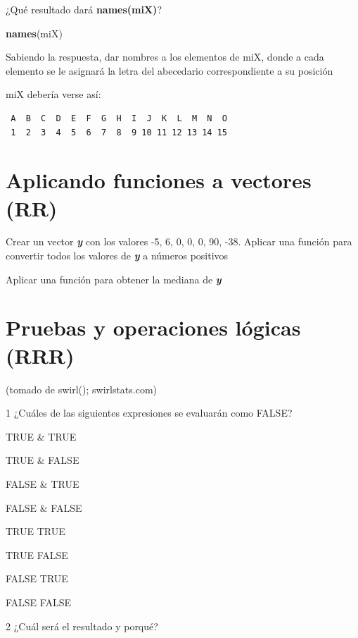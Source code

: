 \documentclass[]{book}
\newenvironment{Shaded}{\begin{snugshade}}{\end{snugshade}}
\newcommand{\KeywordTok}[1]{\textcolor[rgb]{0.13,0.29,0.53}{\textbf{#1}}}
\newcommand{\NormalTok}[1]{#1}
\begin{document}
¿Qué resultado dará \textbf{names(miX)}?

\begin{Shaded}
\begin{Highlighting}[]
\KeywordTok{names}\NormalTok{(miX)}
\end{Highlighting}
\end{Shaded}

Sabiendo la respuesta, dar nombres a los elementos de miX, donde a cada elemento se le asignará la letra del abecedario correspondiente a su posición

miX debería verse así:

\begin{verbatim}
 A  B  C  D  E  F  G  H  I  J  K  L  M  N  O 
 1  2  3  4  5  6  7  8  9 10 11 12 13 14 15 
\end{verbatim}

\hypertarget{aplicando-funciones-a-vectores-rr}{%
\section{Aplicando funciones a vectores (RR)}\label{aplicando-funciones-a-vectores-rr}}

Crear un vector \textbf{\emph{y}} con los valores -5, 6, 0, 0, 0, 90, -38. Aplicar una función para convertir todos los valores de \textbf{\emph{y}} a números positivos

Aplicar una función para obtener la mediana de \textbf{\emph{y}}

\hypertarget{pruebas-y-operaciones-luxf3gicas-rrr}{%
\section{Pruebas y operaciones lógicas (RRR)}\label{pruebas-y-operaciones-luxf3gicas-rrr}}

(tomado de swirl(); swirlstats.com)

1 ¿Cuáles de las siguientes expresiones se evaluarán como FALSE?

TRUE \& TRUE

TRUE \& FALSE

FALSE \& TRUE

FALSE \& FALSE

TRUE \textbar{} TRUE

TRUE \textbar{} FALSE

FALSE \textbar{} TRUE

FALSE \textbar{} FALSE

2 ¿Cuál será el resultado y porqué?
\end{document}
